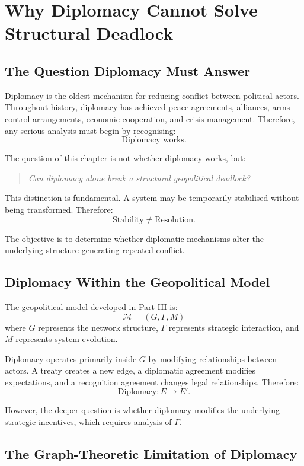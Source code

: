\documentclass[11pt,openany]{book}
\theoremstyle{plain}
\theoremstyle{definition}
\begin{document}
\chapter{Why Diplomacy Cannot Solve Structural Deadlock}

\section*{The Question Diplomacy Must Answer}

Diplomacy is the oldest mechanism for reducing conflict between political actors. Throughout history, diplomacy has achieved peace agreements, alliances, arms-control arrangements, economic cooperation, and crisis management. Therefore, any serious analysis must begin by recognising:
\[
\boxed{
\text{Diplomacy works.}
}
\]

The question of this chapter is not whether diplomacy works, but:
\begin{quote}
\textit{Can diplomacy alone break a structural geopolitical deadlock?}
\end{quote}

This distinction is fundamental. A system may be temporarily stabilised without being transformed. Therefore:
\[
\text{Stability}
\neq
\text{Resolution}.
\]

The objective is to determine whether diplomatic mechanisms alter the underlying structure generating repeated conflict.

\section*{Diplomacy Within the Geopolitical Model}

The geopolitical model developed in Part III is:
\[
\mathcal{M} = (G, \Gamma, M)
\]
where \(G\) represents the network structure, \(\Gamma\) represents strategic interaction, and \(M\) represents system evolution.

Diplomacy operates primarily inside \(G\) by modifying relationships between actors. A treaty creates a new edge, a diplomatic agreement modifies expectations, and a recognition agreement changes legal relationships. Therefore:
\[
\text{Diplomacy}: E \longrightarrow E'.
\]

However, the deeper question is whether diplomacy modifies the underlying strategic incentives, which requires analysis of \(\Gamma\).

\section*{The Graph-Theoretic Limitation of Diplomacy}
\end{document}

